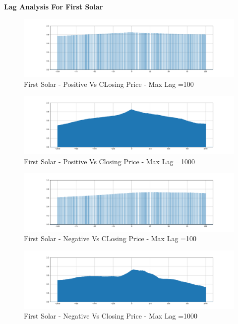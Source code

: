 \documentclass[sigconf, nonacm]{acmart}
\begin{document}
\textbf{Lag Analysis For First Solar}
\newline
\begin{figure}[H]
  \centering
  \includegraphics[width=\linewidth]{images/fslr_100_pos.png}
  \caption{First Solar - Positive Vs CLosing Price - Max Lag =100}
\end{figure}

\begin{figure}[H]
  \centering
  \includegraphics[width=\linewidth]{images/fslr_1000_pos.png}
  \caption{First Solar - Positive Vs Closing Price - Max Lag =1000}
\end{figure}




\begin{figure}[H]
  \centering
  \includegraphics[width=\linewidth]{images/fslr_100_neg.png}
  \caption{First Solar - Negative Vs CLosing Price - Max Lag =100}
\end{figure}

\begin{figure}[H]
  \centering
  \includegraphics[width=\linewidth]{images/fslr_1000_neg.png}
  \caption{First Solar - Negative Vs Closing Price - Max Lag =1000}
\end{figure}
\end{document}
